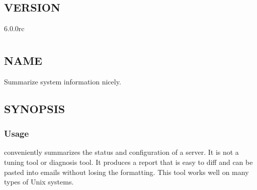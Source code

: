\documentclass[letterpaper,10pt,english]{sphinxmanual}
\begin{document}
\section{VERSION}
\label{\detokenize{mariadb-summary:version}}
 6.0.0rc


\chapter{}
\label{\detokenize{mariadb-system-summary:mariadb-system-summary}}\label{\detokenize{mariadb-system-summary::doc}}

\section{NAME}
\label{\detokenize{mariadb-system-summary:name}}
 \sphinxhyphen{} Summarize system information nicely.


\section{SYNOPSIS}
\label{\detokenize{mariadb-system-summary:synopsis}}

\subsection{Usage}
\label{\detokenize{mariadb-system-summary:usage}}
\begin{sphinxVerbatim}[commandchars=\\\{\}]
\end{sphinxVerbatim}

 conveniently summarizes the status and configuration of
a server. It is not a tuning tool or diagnosis tool.  It produces a report that
is easy to diff and can be pasted into emails without losing the formatting.
This tool works well on many types of Unix systems.
\end{document}
